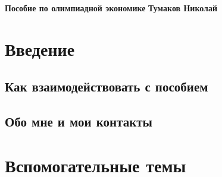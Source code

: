 



\thispagestyle{plain}
\begin{titlepage}
    \hfill\begin{center}
        \begin{tcolorbox}[collower=\mycolor{\mycolorlower},colupper=\mycolor{\mycolorupper},colframe=\mycolor{\mycolorframe},colback=\mycolor{\mycolorback},fonttitle=\Large\bfseries\centering,title=Модель Хотеллинга. Сигналинг. Вертикальное дифференциация товара]
        \large\centering\textbf{Пособие по олимпиадной экономике}
        \tcblower
        \centering\textbf{Тумаков Николай}
        \end{tcolorbox}
    \end{center}
\end{titlepage}

\restoregeometry

\tableofcontents

\chapter{Введение}
\section{Как взаимодействовать с пособием}
\section{Обо мне и мои контакты}

\chapter{Вспомогательные темы}
